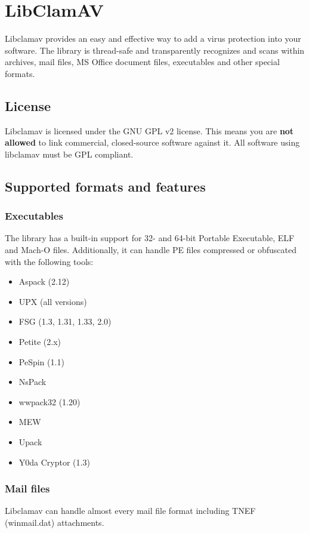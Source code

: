 \documentclass[a4paper,titlepage,12pt]{article}
\begin{document}
    \section{LibClamAV}
    Libclamav provides an easy and effective way to add a virus protection into
    your software. The library is thread-safe and transparently recognizes and
    scans within archives, mail files, MS Office document files, executables
    and other special formats.

    \subsection{License}
    Libclamav is licensed under the GNU GPL v2 license. This means you are
    \textbf{not allowed} to link commercial, closed-source software
    against it. All software using libclamav must be GPL compliant.

    \subsection{Supported formats and features}

    \subsubsection{Executables}
    The library has a built-in support for 32- and 64-bit Portable Executable,
    ELF and Mach-O files. Additionally, it can handle PE files compressed or
    obfuscated with the following tools:
    \begin{itemize}
	\item Aspack (2.12)
	\item UPX (all versions)
	\item FSG (1.3, 1.31, 1.33, 2.0)
	\item Petite (2.x)
	\item PeSpin (1.1)
	\item NsPack
	\item wwpack32 (1.20)
	\item MEW
	\item Upack
	\item Y0da Cryptor (1.3)
    \end{itemize}

    \subsubsection{Mail files}
    Libclamav can handle almost every mail file format including TNEF
    (winmail.dat) attachments.
\end{document}
